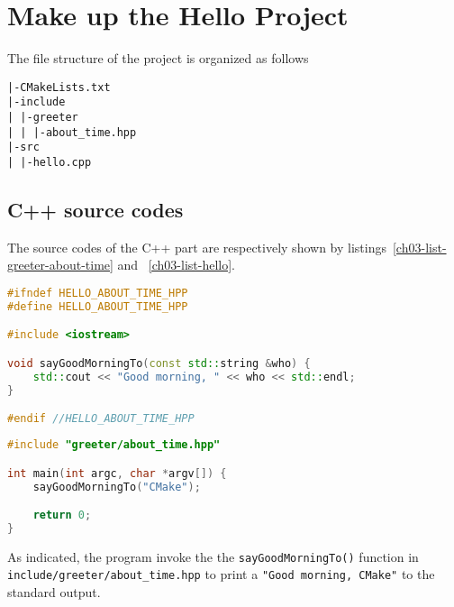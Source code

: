 \documentclass[a4paper,10pt]{book}
\newcommand{\mkeyword}[1]{{\color{magenta} \lstinline!#1!}}
\begin{document}
\section{Make up the Hello Project}
The file structure of the project is organized as follows
\begin{lstlisting}
|-CMakeLists.txt
|-include
| |-greeter
| | |-about_time.hpp
|-src
| |-hello.cpp
\end{lstlisting}
\subsection{C++ source codes}
The source codes of the C++ part are respectively shown by listings~\ref{ch03-list-greeter-about-time} and ~\ref{ch03-list-hello}. \par
\begin{lstlisting}[caption={Codes for \texttt{include/greeter/about\_time.hpp}},label=ch03-list-greeter-about-time,language=C++]
#ifndef HELLO_ABOUT_TIME_HPP
#define HELLO_ABOUT_TIME_HPP

#include <iostream>

void sayGoodMorningTo(const std::string &who) {
    std::cout << "Good morning, " << who << std::endl;
}

#endif //HELLO_ABOUT_TIME_HPP
\end{lstlisting}
\begin{lstlisting}[caption={Codes for \texttt{src/hello.cpp}},label=ch03-list-hello,language=C++]
#include "greeter/about_time.hpp"

int main(int argc, char *argv[]) {
    sayGoodMorningTo("CMake");

    return 0;
}
\end{lstlisting}
As indicated, the program invoke the the \mkeyword{sayGoodMorningTo()} function in \texttt{include/greeter/about\_time.hpp} to print a \mkeyword{"Good morning, CMake"} to the standard output.
\end{document}

